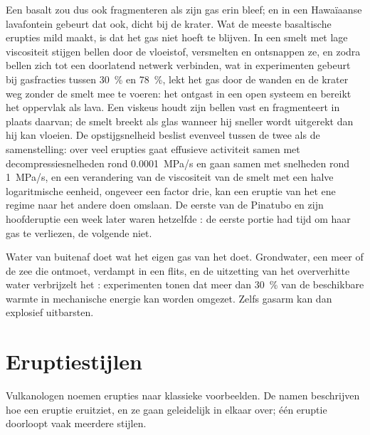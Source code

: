 Een basalt zou dus ook fragmenteren als zijn gas erin bleef; en in een Hawaïaanse
lavafontein gebeurt dat ook, dicht bij de krater. Wat de meeste basaltische erupties mild maakt, is dat
het gas niet hoeft te blijven. In een smelt met lage viscositeit stijgen bellen door de
vloeistof, versmelten en ontsnappen ze, en zodra bellen zich tot een doorlatend netwerk verbinden,
wat in experimenten gebeurt bij gasfracties tussen \qty{30}{\percent} en \qty{78}{\percent},
lekt het gas door de wanden en de krater weg zonder de
smelt mee te voeren: het  ontgast in een open systeem en bereikt het oppervlak als
lava. Een viskeus  houdt zijn bellen vast en fragmenteert in plaats daarvan; de smelt breekt
als glas wanneer hij sneller wordt uitgerekt dan hij kan vloeien. De opstijgsnelheid beslist
evenveel tussen de twee als de samenstelling: over veel erupties gaat effusieve activiteit
samen met decompressiesnelheden rond \qty{0.0001}{MPa/s} en gaan 
samen met snelheden rond \qty{1}{MPa/s}, en een verandering van de viscositeit van de smelt met een halve
logaritmische eenheid, ongeveer een factor drie, kan een eruptie van het ene regime naar
het andere doen omslaan. De eerste  van de Pinatubo en zijn hoofderuptie een week later
waren hetzelfde : de eerste portie had tijd om haar gas te verliezen, de volgende niet.

Water van buitenaf doet wat het eigen gas van het  doet. Grondwater, een meer of de
zee die  ontmoet, verdampt in een flits, en de uitzetting van het oververhitte
water verbrijzelt het : experimenten tonen dat meer dan \qty{30}{\percent} van
de beschikbare warmte in mechanische energie kan worden omgezet. Zelfs gasarm 
kan dan explosief uitbarsten.

\section{Eruptiestijlen}

Vulkanologen noemen erupties naar klassieke voorbeelden. De namen beschrijven hoe een
eruptie eruitziet, en ze gaan geleidelijk in elkaar over; één eruptie doorloopt vaak
meerdere stijlen.

